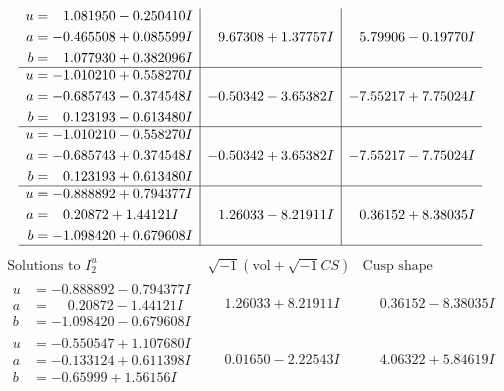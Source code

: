 \documentclass[1p]{elsarticle_modified}
\theoremstyle{definition}
\newcommand{\I}{\sqrt{-1}}
\begin{document}
$$\begin{array}{c|c|c}
\begin{aligned}
u &= \phantom{-}1.081950 - 0.250410 I \\
a &= -0.465508 + 0.085599 I \\
b &= \phantom{-}1.077930 + 0.382096 I\end{aligned}
 & \phantom{-}9.67308 + 1.37757 I & \phantom{-}5.79906 - 0.19770 I \\ \hline\begin{aligned}
u &= -1.010210 + 0.558270 I \\
a &= -0.685743 - 0.374548 I \\
b &= \phantom{-}0.123193 - 0.613480 I\end{aligned}
 & -0.50342 - 3.65382 I & -7.55217 + 7.75024 I \\ \hline\begin{aligned}
u &= -1.010210 - 0.558270 I \\
a &= -0.685743 + 0.374548 I \\
b &= \phantom{-}0.123193 + 0.613480 I\end{aligned}
 & -0.50342 + 3.65382 I & -7.55217 - 7.75024 I \\ \hline\begin{aligned}
u &= -0.888892 + 0.794377 I \\
a &= \phantom{-}0.20872 + 1.44121 I \\
b &= -1.098420 + 0.679608 I\end{aligned}
 & \phantom{-}1.26033 - 8.21911 I & \phantom{-}0.36152 + 8.38035 I\\
 \hline 
 \end{array}$$\newpage$$\begin{array}{c|c|c}  
\text{Solutions to }I^u_{2}& \I (\text{vol} + \sqrt{-1}CS) & \text{Cusp shape}\\
 \hline 
\begin{aligned}
u &= -0.888892 - 0.794377 I \\
a &= \phantom{-}0.20872 - 1.44121 I \\
b &= -1.098420 - 0.679608 I\end{aligned}
 & \phantom{-}1.26033 + 8.21911 I & \phantom{-}0.36152 - 8.38035 I \\ \hline\begin{aligned}
u &= -0.550547 + 1.107680 I \\
a &= -0.133124 + 0.611398 I \\
b &= -0.65999 + 1.56156 I\end{aligned}
 & \phantom{-}0.01650 - 2.22543 I & \phantom{-}4.06322 + 5.84619 I \\ \hline\begin{aligned}

\end{aligned}
\end{array}$$
\end{document}
